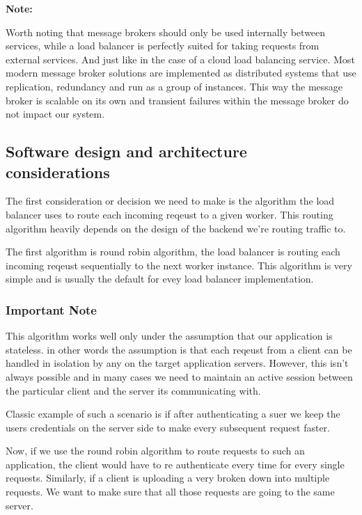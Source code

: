 \documentclass[a4paper, 11pt]{book}
\newenvironment{note}{
    \begin{siderule}
        \textbf{Note: }
        }{
    \end{siderule}}
\begin{document}
    \begin{note}
    Worth noting that message brokers should only be used internally between services, while a load balancer is perfectly suited for taking requests from external services.
    And just like in the case of a cloud load balancing service.
    Most modern message broker solutions are implemented as distributed systems that use replication, redundancy and run as a group of instances.
    This way the message broker is scalable on its own and transient failures within the message broker do not impact our system.
    \end{note}

    \subsection{Software design and architecture considerations}
    The first consideration or decision we need to make is the algorithm the load balancer uses to route each incoming reqeust to a given worker.
    This routing algorithm heavily depends on the design of the backend we're routing traffic to.

    The first algorithm is round robin algorithm, the load balancer is routing each incoming reqeust sequentially to the next worker instance.
    This algorithm is very simple and is usually the default for evey load balancer implementation.

    \subsubsection{Important Note} This algorithm works well only under the assumption that our application is stateless.
    in other words the assumption is that each reqeust from a client can be handled in isolation by any on the target application servers.
    However, this isn't always possible and in many cases we need to maintain an active session between the particular client and the server its communicating with.

    Classic example of such a scenario is if after authenticating a suer we keep the users credentials on the server side to make every subsequent request faster.

    Now, if we use the round robin algorithm to route requests to such an application, the client would have to re authenticate every time for every single requests.
    Similarly, if a client is uploading a very broken down into multiple requests.
    We want to make sure that all those requests are going to the same server.
\end{document}
